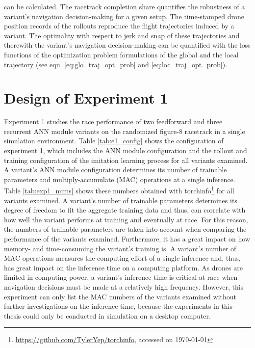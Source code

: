 can be calculated.
The racetrack completion share quantifies
the robustness of a variant's navigation decision-making 
for a given setup.
The time-stamped drone position records of the rollouts
reproduce the flight trajectories induced by a variant.
The optimality with respect to jerk and snap
of these trajectories and therewith the 
variant's navigation decision-making 
can be quantified
with the loss functions of the optimization problem formulations
of the global and the local trajectory
(see equ. \ref{eq:glo_traj_opt_prob} and \ref{eq:loc_traj_opt_prob}).









\section{Design of Experiment 1}
Experiment 1 studies the
race performance of 
two feedforward and three recurrent ANN module variants 
on the randomized figure-8 racetrack 
in a single simulation environment.
Table \ref{tab:e1_config} shows the
configuration of experiment 1,
which includes the ANN module configuration
and the rollout and training configuration 
of the imitation learning process
for all variants examined.
A variant's ANN module configuration
determines its number of trainable parameters and 
multiply-accumulate (MAC) operations at a single inference.
Table \ref{tab:exp1_nums} shows these
numbers
obtained with 
torchinfo\footnote{\url{https://github.com/TylerYep/torchinfo}, accessed on \today}
for all variants examined.
A variant's number of trainable parameters
determines its degree of freedom to fit the aggregate training data
and thus,
can correlate with 
how well the variant performs at training
and eventually at race.
For this reason, the numbers of trainable parameters 
are taken into account
when comparing the performance of the variants examined.
Furthermore, it has a great impact on
how memory- and time-consuming the variant's training is.
A variant's number of MAC operations 
measures the computing effort of a single inference
and, thus, has great impact on the inference time
on a computing platform.
As drones are limited in computing power,
a variant's inference time 
is critical at race when 
navigation decisions
must be made at a relatively high frequency.
However, this experiment
can only list the MAC numbers of the variants examined
without further investigations on the inference time,
because the experiments in this thesis
could only be conducted in simulation on a desktop computer.


